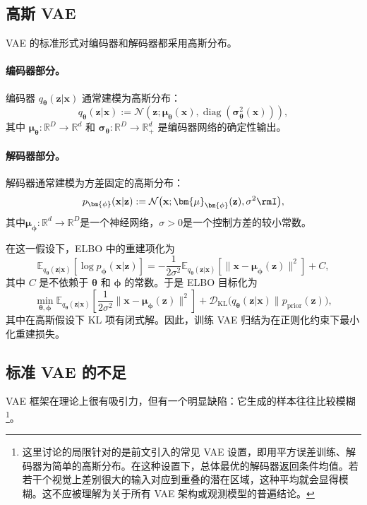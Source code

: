 \subsection{高斯 VAE}\label{subsec:optimization-vae}
VAE 的标准形式对编码器和解码器都采用高斯分布。
\paragraph{编码器部分。}
编码器 $ q_{\bm{\theta}}(\mathbf{z} | \mathbf{x}) $ 通常建模为高斯分布：
\[
q_{\bm{\theta}}(\mathbf{z} | \mathbf{x}) := \mathcal{N}\left(\mathbf{z}; \bm{\mu}_{\bm{\theta}}(\mathbf{x}), \operatorname{diag}(\bm{\sigma}_{\bm{\theta}}^2(\mathbf{x}))\right),
\]
其中 $\bm{\mu}_{\bm{\theta}} : \mathbb{R}^D \to \mathbb{R}^d$ 和 $\bm{\sigma}_{\bm{\theta}} : \mathbb{R}^D \to \mathbb{R}_+^d$ 是编码器网络的确定性输出。
\paragraph{解码器部分。} 解码器通常建模为方差固定的高斯分布：
\[
p_{\bm{\phi}}(\mathbf{x}|\mathbf{z}) := \mathcal{N}\bigl(\mathbf{x}; \bm{\mu}_{\bm{\phi}}(\mathbf{z}), \sigma^2 \rmI\bigr),
\]
其中$\bm{\mu}_{\bm{\phi}} : \mathbb{R}^d \to \mathbb{R}^D$是一个神经网络，$\sigma > 0$是一个控制方差的较小常数。

在这一假设下，ELBO 中的重建项化为
\[
\mathbb{E}_{q_{\bm{\theta}}(\mathbf{z} | \mathbf{x})} \left[\log p_{\bm{\phi}}(\mathbf{x} | \mathbf{z})\right]
= - \frac{1}{2\sigma^2} \mathbb{E}_{q_{\bm{\theta}}(\mathbf{z} | \mathbf{x})} \left[\|\mathbf{x} - \bm{\mu}_{\bm{\phi}}(\mathbf{z})\|^2\right] + C,
\]
其中 $C$ 是不依赖于 $\bm{\theta}$ 和 $\bm{\phi}$ 的常数。于是 ELBO 目标化为
\[
\min_{\bm{\theta}, \bm{\phi}}  \mathbb{E}_{q_{\bm{\theta}}(\mathbf{z} | \mathbf{x})} \left[ \frac{1}{2\sigma^2} \|\mathbf{x} - \bm{\mu}_{\bm{\phi}}(\mathbf{z})\|^2 \right]
+ \mathcal{D}_{\mathrm{KL}}\big(q_{\bm{\theta}}(\mathbf{z} | \mathbf{x}) \| p_{\mathrm{prior}}(\mathbf{z})\big),
\]
其中在高斯假设下 KL 项有闭式解。因此，训练 VAE 归结为在正则化约束下最小化重建损失。

\subsection{标准 VAE 的不足}\label{sec:drawback_standard_VAE}
VAE 框架在理论上很有吸引力，但有一个明显缺陷：它生成的样本往往比较模糊\footnote{这里讨论的局限针对的是前文引入的常见 VAE 设置，即用平方误差训练、解码器为简单的高斯分布。在这种设置下，总体最优的解码器返回条件均值。若若干个视觉上差别很大的输入对应到重叠的潜在区域，这种平均就会显得模糊。这不应被理解为关于所有 VAE 架构或观测模型的普遍结论。}。

